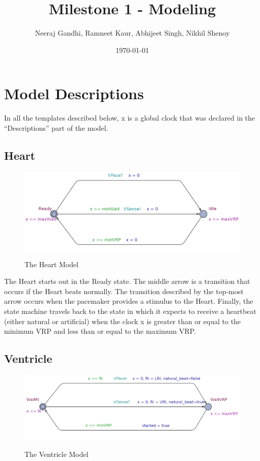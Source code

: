 \documentclass[10pt]{article}
\begin{document}
\title{\vspace{-2.0cm}Milestone 1 - Modeling}
\author{Neeraj Gandhi, Ramneet Kaur, Abhijeet Singh, Nikhil Shenoy}
\date{\today}

\maketitle

\section{Model Descriptions}
	In all the templates described below, x is a global clock that was declared in the “Descriptions” part of the model.

	\subsection{Heart}

		\begin{figure}[h]
			\includegraphics[scale=.35]{heart_model.jpg}
			\label{heart_model}
			\centering
			\caption{The Heart Model}
		\end{figure}

		The Heart starts out in the Ready state. The middle arrow is a transition that occurs if the Heart beats normally. The transition described by the top-most arrow occurs when the pacemaker provides a stimulus to the Heart. Finally, the state machine travels back to the state in which it expects to receive a heartbeat (either natural or artificial) when the clock x is greater than or equal to the minimum VRP and less than or equal to the maximum VRP.


	\subsection{Ventricle}
		\begin{figure}[h]
			\includegraphics[scale=.35]{ventricle_model.jpg}
			\label{ventricle_model}
			\centering
			\caption{The Ventricle Model}
		\end{figure}
\end{document}
